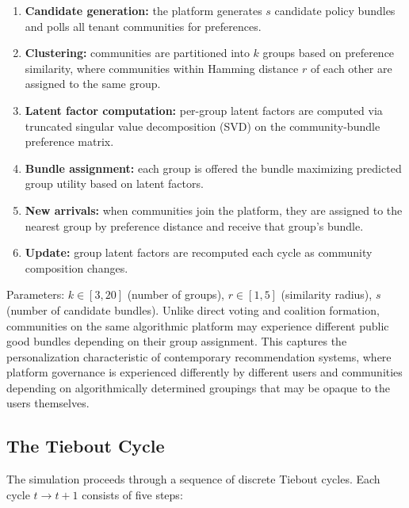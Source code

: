 \documentclass[12pt]{article}
\begin{document}
\begin{enumerate}
    \item \textbf{Candidate generation:} the platform generates $s$ candidate policy bundles and polls all tenant communities for preferences.
    \item \textbf{Clustering:} communities are partitioned into $k$ groups based on preference similarity, where communities within Hamming distance $r$ of each other are assigned to the same group.
    \item \textbf{Latent factor computation:} per-group latent factors are computed via truncated singular value decomposition (SVD) on the community-bundle preference matrix.
    \item \textbf{Bundle assignment:} each group is offered the bundle maximizing predicted group utility based on latent factors.
    \item \textbf{New arrivals:} when communities join the platform, they are assigned to the nearest group by preference distance and receive that group's bundle.
    \item \textbf{Update:} group latent factors are recomputed each cycle as community composition changes.
\end{enumerate}

\noindent Parameters: $k \in [3,20]$ (number of groups), $r \in [1,5]$ (similarity radius), $s$ (number of candidate bundles). Unlike direct voting and coalition formation, communities on the same algorithmic platform may experience different public good bundles depending on their group assignment. This captures the personalization characteristic of contemporary recommendation systems, where platform governance is experienced differently by different users and communities depending on algorithmically determined groupings that may be opaque to the users themselves.

\subsection{The Tiebout Cycle}
\label{sec:cycle}

The simulation proceeds through a sequence of discrete Tiebout cycles. Each cycle $t \rightarrow t+1$ consists of five steps:
\end{document}
